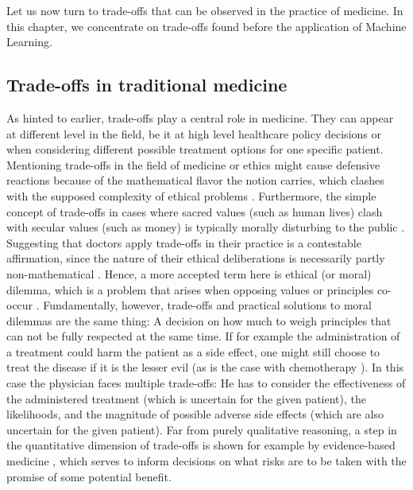 Let us now turn to trade-offs that can be observed in the practice of medicine.
In this chapter, we concentrate on trade-offs found before the application of Machine Learning.


\subsection{Trade-offs in traditional medicine}
    As hinted to earlier, trade-offs play a central role in medicine.
	They can appear at different level in the field, be it at high level healthcare policy decisions or when considering different possible treatment options for one specific patient.
    Mentioning trade-offs in the field of medicine or ethics might cause defensive reactions because of the mathematical flavor the notion carries, which clashes with the supposed complexity of ethical problems \cite{Williamson2021}.
    Furthermore, the simple concept of trade-offs in cases where sacred values (such as human lives) clash with secular values (such as money) is typically morally disturbing to the public \cite{Tetlock2003}.
    Suggesting that doctors apply trade-offs in their practice is a contestable affirmation, since the nature of their ethical deliberations is necessarily partly non-mathematical \cite{Zerilli2019}.
    Hence, a more accepted term here is ethical (or moral) dilemma, which is a problem that arises when opposing values or principles co-occur \cite{Dijkstra2020}.
    Fundamentally, however, trade-offs and practical solutions to moral dilemmas are the same thing: A decision on how much to weigh principles that can not be fully respected at the same time.
    If for example the administration of a treatment could harm the patient as a side effect, one might still choose to treat the disease if it is the lesser evil (as is the case with chemotherapy \cite{oronsky2016medical}).
    In this case the physician faces multiple trade-offs:
	He has to consider the effectiveness of the administered treatment (which is uncertain for the given patient), the likelihoods, and the magnitude of possible adverse side effects (which are also uncertain for the given patient).
    Far from purely qualitative reasoning, a step in the quantitative dimension of trade-offs is shown for example by evidence-based medicine \cite{Launer2020}, which serves to inform decisions on what risks are to be taken with the promise of some potential benefit.


